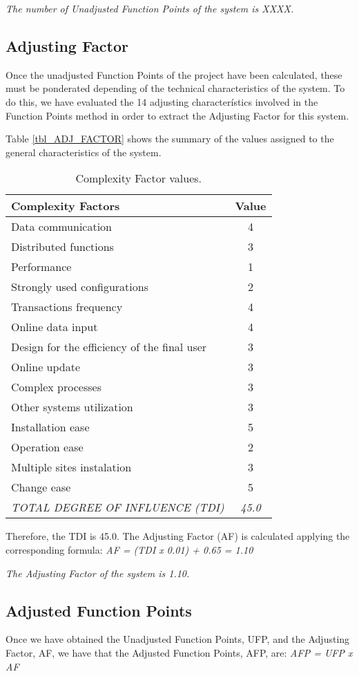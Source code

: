 \emph{The number of Unadjusted Function Points of the system is XXXX.}


\subsection{Adjusting Factor}
Once the unadjusted Function Points of the project have been calculated, these must be ponderated depending of the technical characteristics of the system. To do this, we have evaluated the 14 adjusting characterístics involved in the Function Points method in order to extract the Adjusting Factor for this system.

Table \ref{tbl_ADJ_FACTOR} shows the summary of the values assigned to the general characteristics of the system.

\begin{table}[hbtp]
\centering
\begin{tabular}{l|c}
\textbf{Complexity Factors} & \textbf{Value} \\ \hline
Data communication & 4 \\
Distributed functions & 3 \\
Performance & 1 \\
Strongly used configurations & 2 \\
Transactions frequency & 4 \\
Online data input & 4 \\
Design for the efficiency of the final user & 3 \\
Online update & 3 \\
Complex processes & 3 \\
Other systems utilization & 3 \\
Installation ease & 5 \\
Operation ease & 2 \\
Multiple sites instalation & 3 \\
Change ease & 5 \\ \hline
\textit{TOTAL DEGREE OF INFLUENCE (TDI)} & \textit{45.0}
\end{tabular}
\caption{Complexity Factor values.}
\label{tbl_FPEstimation}
\end{table}

Therefore, the TDI is 45.0. The Adjusting Factor (AF) is calculated applying the corresponding formula:
\emph{AF = (TDI x 0.01) + 0.65 = 1.10}

\emph{The Adjusting Factor of the system is 1.10.}

\subsection{Adjusted Function Points}
Once we have obtained the Unadjusted Function Points, UFP, and the Adjusting Factor, AF, we have that the Adjusted Function Points, AFP, are:
\emph{AFP = UFP x AF}

